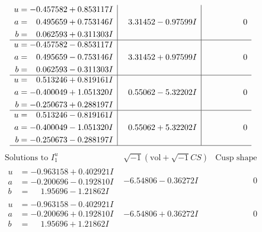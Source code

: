 \documentclass[1p]{elsarticle_modified}
\theoremstyle{definition}
\newcommand{\I}{\sqrt{-1}}
\begin{document}
$$\begin{array}{c|c|c}
\begin{aligned}
u &= -0.457582 + 0.853117 I \\
a &= \phantom{-}0.495659 + 0.753146 I \\
b &= \phantom{-}0.062593 + 0.311303 I\end{aligned}
 & \phantom{-}3.31452 - 0.97599 I & \phantom{-0.000000 } 0 \\ \hline\begin{aligned}
u &= -0.457582 - 0.853117 I \\
a &= \phantom{-}0.495659 - 0.753146 I \\
b &= \phantom{-}0.062593 - 0.311303 I\end{aligned}
 & \phantom{-}3.31452 + 0.97599 I & \phantom{-0.000000 } 0 \\ \hline\begin{aligned}
u &= \phantom{-}0.513246 + 0.819161 I \\
a &= -0.400049 + 1.051320 I \\
b &= -0.250673 + 0.288197 I\end{aligned}
 & \phantom{-}0.55062 - 5.32202 I & \phantom{-0.000000 } 0 \\ \hline\begin{aligned}
u &= \phantom{-}0.513246 - 0.819161 I \\
a &= -0.400049 - 1.051320 I \\
b &= -0.250673 - 0.288197 I\end{aligned}
 & \phantom{-}0.55062 + 5.32202 I & \phantom{-0.000000 } 0\\
 \hline 
 \end{array}$$\newpage$$\begin{array}{c|c|c}  
\text{Solutions to }I^u_{1}& \I (\text{vol} + \sqrt{-1}CS) & \text{Cusp shape}\\
 \hline 
\begin{aligned}
u &= -0.963158 + 0.402921 I \\
a &= -0.200696 - 0.192810 I \\
b &= \phantom{-}1.95696 - 1.21862 I\end{aligned}
 & -6.54806 - 0.36272 I & \phantom{-0.000000 } 0 \\ \hline\begin{aligned}
u &= -0.963158 - 0.402921 I \\
a &= -0.200696 + 0.192810 I \\
b &= \phantom{-}1.95696 + 1.21862 I\end{aligned}
 & -6.54806 + 0.36272 I & \phantom{-0.000000 } 0 \\ \hline\begin{aligned}

\end{aligned}
\end{array}$$
\end{document}
